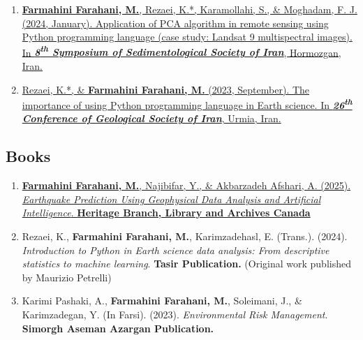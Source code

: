 \documentclass[letterpaper,10pt]{article}
\begin{document}
\begin{justify}
\begin{enumerate}[label=\arabic*.,left=0pt,topsep=1pt,partopsep=0pt,itemsep=1pt,parsep=0pt]
			\item \href{https://www.researchgate.net/publication/377838524_Application_of_PCA_algorithm_in_remote_sensing_using_Python_programming_language_case_study_Landsat_9_multispectral_images}{\textbf{Farmahini Farahani, M.}, Rezaei, K.*, Karamollahi, S., \& Moghadam, F. J. (2024, January). Application of PCA algorithm in remote sensing using Python programming language (case study: Landsat 9 multispectral images). In \textit{\textbf{8\textsuperscript{th} Symposium of Sedimentological Society of Iran}}, Hormozgan, Iran.}
			\item \href{https://www.researchgate.net/publication/374914382_The_importance_of_using_Python_programming_language_in_Earth_science}{Rezaei, K.*, \& \textbf{Farmahini Farahani, M.} (2023, September). The importance of using Python programming language in Earth science. In \textit{\textbf{26\textsuperscript{th} Conference of Geological Society of Iran}}, Urmia, Iran.}
		\end{enumerate}
		
		\subsection*{Books}
		\begin{enumerate}[label=\arabic*.,left=0pt,topsep=1pt,partopsep=0pt,itemsep=1pt,parsep=0pt]
			\item \href{https://www.amazon.com/dp/106932437X/ref=tmm_pap_swatch_0?_encoding=UTF8&dib_tag=se&dib=eyJ2IjoiMSJ9.fV6NcKzNqVmNMx01e9olJh9RUoGgbt3bwYVVMROKdEU.v8uasEadi-iUYNyBqfXdQtpDWmK8WfYL80Y5MgFWLiI&qid=1748198567&sr=1-2}{\textbf{Farmahini Farahani, M.}, Najibifar, Y., \& Akbarzadeh Afshari, A. (2025). \textit{Earthquake Prediction Using Geophysical Data Analysis and Artificial Intelligence}. \textbf{Heritage Branch, Library and Archives Canada}}
			\item Rezaei, K., \textbf{Farmahini Farahani, M.}, Karimzadehasl, E. (Trans.). (2024). \textit{Introduction to Python in Earth science data analysis: From descriptive statistics to machine learning}. \textbf{Tasir Publication.} (Original work published by Maurizio Petrelli)
			\item Karimi Pashaki, A., \textbf{Farmahini Farahani, M.}, Soleimani, J., \& Karimzadegan, Y. (In Farsi). (2023). \textit{Environmental Risk Management}. \textbf{Simorgh Aseman Azargan Publication.}
		\end{enumerate}
	\end{justify}
		\vspace{-1.65em}
\end{document}
